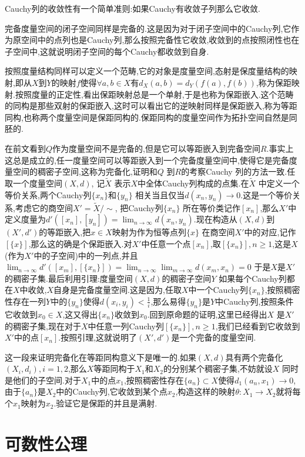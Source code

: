 Cauchy列的收敛性有一个简单准则:如果Cauchy有收敛子列那么它收敛.

完备度量空间的闭子空间同样是完备的.这是因为对于闭子空间中的Cauchy列,它作为原空间中的点列也是Cauchy列,那么按照完备性它收敛,收敛到的点按照闭性也在子空间中,这就说明闭子空间的每个Cauchy都收敛到自身.

按照度量结构同样可以定义一个范畴,它的对象是度量空间,态射是保度量结构的映射,即从$X$到$Y$的映射$f$使得$\forall a,b\in X$有$d_X(a,b)=d_Y(f(a),f(b))$,称为保距映射.按照度量的正定性,看出保距映射总是一个单射,于是也称为保距嵌入.这个范畴的同构是那些双射的保距嵌入,这时可以看出它的逆映射同样是保距嵌入,称为等距同构,也称两个度量空间是保距同构的.保距同构的度量空间作为拓扑空间自然是同胚的.

在前文看到$Q$作为度量空间不是完备的,但是它可以等距嵌入到完备空间$R$.事实上这总是成立的,任一度量空间可以等距嵌入到一个完备度量空间中,使得它是完备度量空间的稠密子空间,这称为完备化,证明和$Q$ 到$R$的考察Cauchy 列的方法一致.任取一个度量空间$(X,d)$, 记$\widetilde{X}$ 表示$X$中全体Cauchy列构成的点集.在$\widetilde{X}$ 中定义一个等价关系,两个Cauchy列$\{x_n\}$和$\{y_n\}$ 相关当且仅当$d(x_n,y_n)\to0$.这是一个等价关系,考虑它的商空间$X'=\widetilde{X}/\sim$, 把Cauchy列$\{x_n\}$ 所在等价类记作$[x_n]$,那么$X'$中定义度量为$d'([x_n],[y_n])=\lim_ {n\to\infty}d(x_n,y_n)$.现在构造从$(X,d)$到$(X',d')$的等距嵌入,把$x\in X$映射为作为恒等点列$\{x\}$ 在商空间$X'$中的对应,记作$[\{x\}]$,那么这的确是个保距嵌入.对$X'$中任意一个点$[x_n]$,取$[\{x_n\}],n\ge1$,这是$X$(作为$X'$中的子空间)中的一列点,并且$\lim_ {n\to\infty}d'([x_m],[\{x_n\}])=\lim_{n\to\infty}\lim_{m\to\infty}d(x_m,x_n)=0$
于是$X$是$X'$的稠密子集.最后利用引理:度量空间$(X,d)$的稠密子空间$Y$ 如果每个Cauchy列都在$X$中收敛,$X$自身是完备度量空间.这是因为,任取$X$中一个Cauchy列$\{x_n\}$,按照稠密性存在一列$Y$中的$\{y_n\}$使得$d(x_i,y_i)<\frac{1}{i}$,那么易得$\{y_n\}$是$Y$中Cauchy列,按照条件它收敛到$x_0\in X$,这又得出$\{x_n\}$收敛到$x_0$.回到原命题的证明,这里已经得出$X$ 是$X'$的稠密子集,现在对于$X$中任意一列Cauchy列$[\{x_n\}],n\ge1$,我们已经看到它收敛到$X'$中的点$[x_n]$.按照引理,这就说明了$(X',d')$是一个完备的度量空间.

这一段来证明完备化在等距同构意义下是唯一的.如果$(X,d)$具有两个完备化$(X_i,d_i),i=1,2$,那么$X$等距同构于$X_1$和$X_2$的分别某个稠密子集,不妨就设$X$ 同时是他们的子空间.对于$X_1$中的点$x_1$,按照稠密性存在$\{a_n\}\subset X$使得$d_1(a_n,x_1)\to0$,由于$\{a_n\}$是$X_2$中的Cauchy列,它收敛到某个点$x_2$,构造这样的映射$\theta:X_1\to X_2$就将每个$x_1$映射为$x_2$.验证它是保距的并且是满射.
\newpage
\section{可数性公理}

